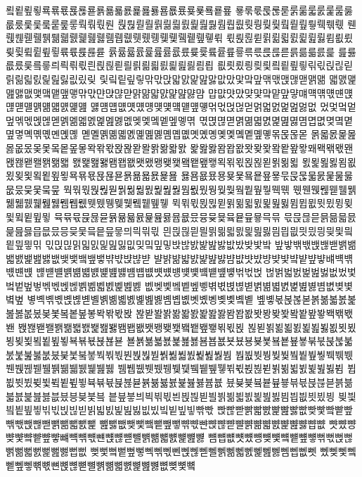 룈룉룊룋룍룎룏룑룒룓룕룖룗룘룙룚룛룜룞룠룢룣룤룥룦
룧룪룫룭룮룯룱룲룳룴룵룶룷룺룼룾룿뤀뤁뤂뤃뤅뤆뤇뤈
뤉뤊뤋뤌뤍뤎뤏뤐뤑뤒뤓뤔뤕뤖뤗뤙뤚뤛뤜뤝뤞뤟뤡뤢뤣
뤤뤥뤦뤧뤨뤩뤪뤫뤬뤭뤮뤯뤰뤱뤲뤳뤴뤵뤶뤷뤸뤹뤺뤻뤾
뤿륁륂륃륅륆륇륈륉륊륋륍륎륐륒륓륔륕륖륗륚륛륝륞륟
륡륢륣륤륥륦륧륪륬륮륯륰륱륲륳륶륷륹륺륻륽륾륿릀릁
릂릃릆릈릋릌릏릐릑릒릓릔릕릖릗릘릙릚릛릜릝릞릟릠릡
릢릣릤릥릦릧릨릩릪릫릮릯릱릲릳릵릶릷릸릹릺릻릾맀맂
맃맄맅맆맇맊맋맍맓맔맕맖맗맚맜맟맠맢맦맧맩맪맫맭맮
맯맰맱맲맳맶맻맼맽맾맿먂먃먄먅먆먇먉먊먋먌먍먎먏먐
먑먒먓먔먖먗먘먙먚먛먜먝먞먟먠먡먢먣먤먥먦먧먨먩먪
먫먬먭먮먯먰먱먲먳먴먵먶먷먺먻먽먾먿멁멃멄멅멆멇멊
멌멏멐멑멒멖멗멙멚멛멝멞멟멠멡멢멣멦멪멫멬멭멮멯멲
멳멵멶멷멹멺멻멼멽멾멿몀몁몂몆몈몉몊몋몍몎몏몐몑몒
몓몔몕몖몗몘몙몚몛몜몝몞몟몠몡몢몣몤몥몦몧몪몭몮몯
몱몳몴몵몶몷몺몼몾몿뫀뫁뫂뫃뫅뫆뫇뫉뫊뫋뫌뫍뫎뫏뫐
뫑뫒뫓뫔뫕뫖뫗뫚뫛뫜뫝뫞뫟뫠뫡뫢뫣뫤뫥뫦뫧뫨뫩뫪뫫
뫬뫭뫮뫯뫰뫱뫲뫳뫴뫵뫶뫷뫸뫹뫺뫻뫽뫾뫿묁묂묃묅묆묇
묈묉묊묋묌묎묐묒묓묔묕묖묗묙묚묛묝묞묟묡묢묣묤묥묦
묧묨묪묬묭묮묯묰묱묲묳묷묹묺묿뭀뭁뭂뭃뭆뭈뭊뭋뭌뭎
뭑뭒뭓뭕뭖뭗뭙뭚뭛뭜뭝뭞뭟뭠뭢뭤뭥뭦뭧뭨뭩뭪뭫뭭뭮
뭯뭰뭱뭲뭳뭴뭵뭶뭷뭸뭹뭺뭻뭼뭽뭾뭿뮀뮁뮂뮃뮄뮅뮆뮇
뮉뮊뮋뮍뮎뮏뮑뮒뮓뮔뮕뮖뮗뮘뮙뮚뮛뮜뮝뮞뮟뮠뮡뮢뮣
뮥뮦뮧뮩뮪뮫뮭뮮뮯뮰뮱뮲뮳뮵뮶뮸뮹뮺뮻뮼뮽뮾뮿믁믂
믃믅믆믇믉믊믋믌믍믎믏믑믒믔믕믖믗믘믙믚믛믜믝믞믟
믠믡믢믣믤믥믦믧믨믩믪믫믬믭믮믯믰믱믲믳믴믵믶믷믺
믻믽믾밁밃밄밅밆밇밊밎밐밒밓밙밚밠밡밢밣밦밨밪밫밬
밮밯밲밳밵밶밷밹밺밻밼밽밾밿뱂뱆뱇뱈뱊뱋뱎뱏뱑뱒뱓
뱔뱕뱖뱗뱘뱙뱚뱛뱜뱞뱟뱠뱡뱢뱣뱤뱥뱦뱧뱨뱩뱪뱫뱬뱭
뱮뱯뱰뱱뱲뱳뱴뱵뱶뱷뱸뱹뱺뱻뱼뱽뱾뱿벀벁벂벃벆벇벉
벊벍벏벐벑벒벓벖벘벛벜벝벞벟벢벣벥벦벩벪벫벬벭벮벯
벲벶벷벸벹벺벻벾벿볁볂볃볅볆볇볈볉볊볋볌볎볒볓볔볖
볗볙볚볛볝볞볟볠볡볢볣볤볥볦볧볨볩볪볫볬볭볮볯볰볱
볲볳볷볹볺볻볽볾볿봀봁봂봃봆봈봊봋봌봍봎봏봑봒봓봕
봖봗봘봙봚봛봜봝봞봟봠봡봢봣봥봦봧봨봩봪봫봭봮봯봰
봱봲봳봴봵봶봷봸봹봺봻봼봽봾봿뵁뵂뵃뵄뵅뵆뵇뵊뵋뵍
뵎뵏뵑뵒뵓뵔뵕뵖뵗뵚뵛뵜뵝뵞뵟뵠뵡뵢뵣뵥뵦뵧뵩뵪뵫
뵬뵭뵮뵯뵰뵱뵲뵳뵴뵵뵶뵷뵸뵹뵺뵻뵼뵽뵾뵿붂붃붅붆붋
붌붍붎붏붒붔붖붗붘붛붝붞붟붠붡붢붣붥붦붧붨붩붪붫붬
붭붮붯붱붲붳붴붵붶붷붹붺붻붼붽붾붿뷀뷁뷂뷃뷄뷅뷆뷇
뷈뷉뷊뷋뷌뷍뷎뷏뷐뷑뷒뷓뷖뷗뷙뷚뷛뷝뷞뷟뷠뷡뷢뷣뷤
뷥뷦뷧뷨뷪뷫뷬뷭뷮뷯뷱뷲뷳뷵뷶뷷뷹뷺뷻뷼뷽뷾뷿븁븂
븄븆븇븈븉븊븋븎븏븑븒븓븕븖븗븘븙븚븛븞븠븡븢븣븤
븥븦븧븨븩븪븫븬븭븮븯븰븱븲븳븴븵븶븷븸븹븺븻븼븽
븾븿빀빁빂빃빆빇빉빊빋빍빏빐빑빒빓빖빘빜빝빞빟빢빣
빥빦빧빩빫빬빭빮빯빲빶빷빸빹빺빾빿뺁뺂뺃뺅뺆뺇뺈뺉
뺊뺋뺎뺒뺓뺔뺕뺖뺗뺚뺛뺜뺝뺞뺟뺠뺡뺢뺣뺤뺥뺦뺧뺩뺪
뺫뺬뺭뺮뺯뺰뺱뺲뺳뺴뺵뺶뺷뺸뺹뺺뺻뺼뺽뺾뺿뻀뻁뻂뻃
뻄뻅뻆뻇뻈뻉뻊뻋뻌뻍뻎뻏뻒뻓뻕뻖뻙뻚뻛뻜뻝뻞뻟뻡뻢
뻦뻧뻨뻩뻪뻫뻭뻮뻯뻰뻱뻲뻳뻴뻵뻶뻷뻸뻹뻺뻻뻼뻽뻾뻿
뼀뼂뼃뼄뼅뼆뼇뼊뼋뼌뼍뼎뼏뼐뼑뼒뼓뼔뼕뼖뼗뼚뼞뼟뼠
